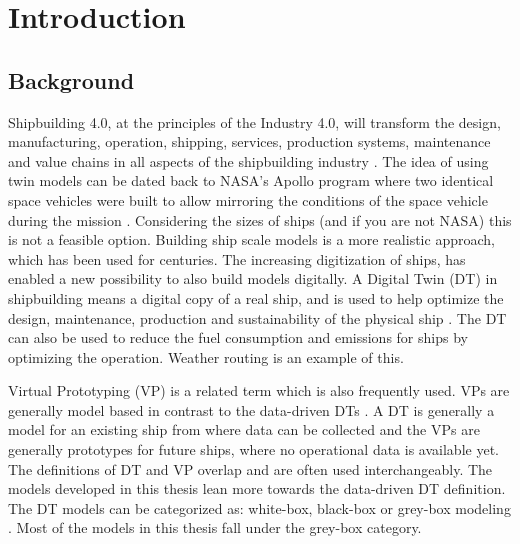 \chapter{Introduction}
\section{Background}
Shipbuilding 4.0, at the principles of the Industry 4.0, will transform the design, manufacturing, operation, shipping, services, production systems, maintenance and value chains in all aspects of the shipbuilding industry \cite{stanic_toward_2018}.
The idea of using twin models can be dated back to NASA’s Apollo program where two identical space vehicles were built to allow mirroring the conditions of the space vehicle during the mission \cite{rosen_about_2015}. Considering the sizes of ships (and if you are not NASA) this is not a feasible option. Building ship scale models is a more realistic approach, which has been used for centuries. The increasing digitization of ships, has enabled a new possibility to also build models digitally. A Digital Twin (DT) in shipbuilding means a digital copy of a real ship, and is used to help optimize the design, maintenance, production and sustainability of the physical ship \cite{chen_review_2021}. The DT can also be used to reduce the fuel consumption and emissions for ships by optimizing the operation. Weather routing is an example of this. 

Virtual Prototyping (VP) is a related term which is also frequently used. VPs are generally model based in contrast to the data-driven DTs \cite{major_framework_2021}. A DT is generally a model for an existing ship from where data can be collected and the VPs are generally prototypes for future ships, where no operational data is available yet. The definitions of DT and VP overlap and are often used interchangeably. The models developed in this thesis lean more towards the data-driven DT definition. The DT models can be categorized as: white-box, black-box or grey-box modeling \cite{leifsson_grey-box_2008}. Most of the models in this thesis fall under the grey-box category.

